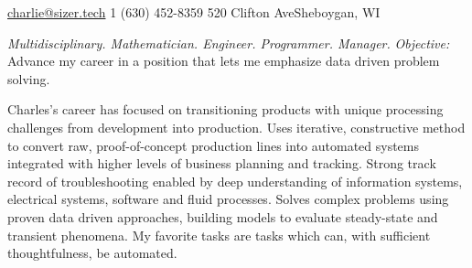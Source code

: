 \documentclass[10pt,a4paper]{article} %
\begin{document}


\noindent\href{mailtto:charlie@sizer.tech}{charlie@sizer.tech}\bull %
\textsmaller{+}1 (630) 452-8359\bull %
520 Clifton Ave\bull Sheboygan, WI%

\spacedhrule{0.9em}{-0.4em} %



\vspace{-1.3em} %

\begin{multicols}{2}  %
\noindent \textit{Multidisciplinary. Mathematician. Engineer. Programmer. Manager.}%
\emph{Objective: }Advance my career in a position that lets me emphasize  data driven problem solving. %

Charles's career has focused on transitioning products with unique processing challenges from development into production.  Uses iterative, constructive method to convert raw, proof-of-concept production lines into automated systems integrated with higher levels of business planning and tracking. Strong track record of troubleshooting enabled by deep understanding of information systems, electrical systems, software and fluid processes. Solves complex problems using proven data driven approaches, building models to evaluate steady-state and transient phenomena. My favorite tasks are tasks which can, with sufficient thoughtfulness, be automated. 

\end{multicols}
\end{document}
